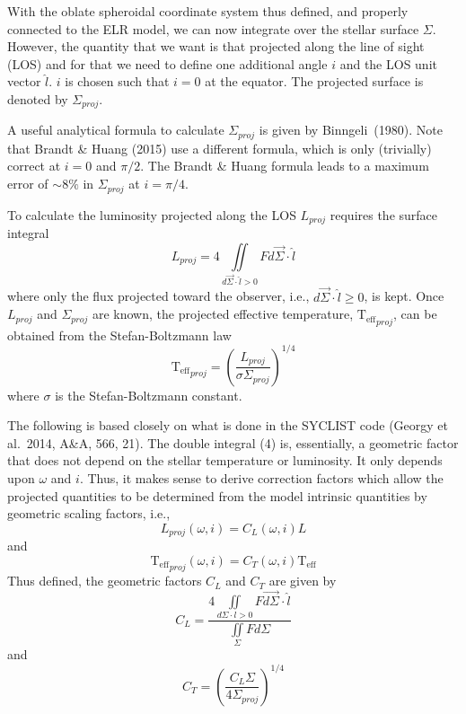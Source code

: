 \documentclass[12pt]{article}
\newcommand{\Teff}{\mathrm{T_{eff}}}
\begin{document}
With the oblate spheroidal coordinate system thus defined, and properly
connected to the ELR model, we can now integrate over the stellar surface
$\Sigma$. However, the quantity that we want is that projected along the line
of sight (LOS) and for that we need to define one additional angle $i$ and the
LOS unit vector $\hat{l}$. $i$ is chosen such that $i = 0$ at the equator.
The projected surface is denoted by $\Sigma_{proj}$.

A useful analytical formula to calculate $\Sigma_{proj}$ is given by
Binngeli~(1980). Note that Brandt \& Huang (2015) use a different formula,
which is only (trivially) correct at $i = 0$ and $\pi/2$. The Brandt \& Huang
formula leads to a maximum error of $\sim8\%$ in $\Sigma_{proj}$ at $i = \pi/4$.

To calculate the luminosity projected along the LOS $L_{proj}$ requires the
surface integral
\begin{equation}
  L_{proj} = 4 \iint \limits_{d\vec{\Sigma} \cdot \hat{l} > 0} F d\vec{\Sigma} \cdot \hat{l}
\end{equation}
where only the flux projected toward the observer, i.e., $d\vec{\Sigma} \cdot \hat{l} \geq 0$, is kept. Once $L_{proj}$ and $\Sigma_{proj}$ are known, the projected effective temperature, $\Teff_{proj}$, can be obtained from the Stefan-Boltzmann law
\begin{equation}
\Teff_{proj} = \left( \frac{L_{proj}}{\sigma \Sigma_{proj}} \right)^{1/4}
\end{equation}
where $\sigma$ is the Stefan-Boltzmann constant.

The following is based closely on what is done in the SYCLIST code
(Georgy et al.\ 2014, A\&A, 566, 21). The double integral (4) is, essentially, a
geometric factor that does not depend on the stellar temperature or luminosity.
It only depends upon $\omega$ and $i$. Thus, it makes sense to derive correction
factors which allow the projected quantities to be determined from the model
intrinsic quantities by geometric scaling factors, i.e.,
\begin{equation}
  L_{proj}(\omega,i) = C_L(\omega,i) L
\end{equation}
and
\begin{equation}
  \Teff_{proj}(\omega,i) = C_T(\omega,i) \Teff
\end{equation}
Thus defined, the geometric factors $C_L$ and $C_T$ are given by
\begin{equation}
C_L = \frac{4 \iint\limits_{d\Sigma \cdot l > 0} F \vec{d\Sigma} \cdot \hat{l} }{\iint\limits_\Sigma F d\Sigma}
\end{equation}
and
\begin{equation}
C_T = \left( \frac{C_L \Sigma}{4 \Sigma_{proj}} \right)^{1/4}
\end{equation}
\end{document}
